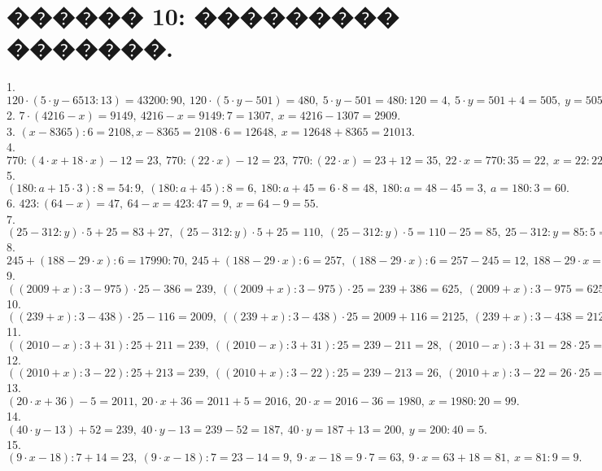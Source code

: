 \documentclass[12pt]{article}
\begin{document}
\section{������ 10: ��������� �������.}
1. $120\cdot(5\cdot y-6513:13)=43200:90,\ 120\cdot(5\cdot y-501)=480,\ 5\cdot y-501=480:120=4,\ 5\cdot y=501+4=505,\ y=505:5=101.$\\
2. $7\cdot(4216-x)=9149,\ 4216-x=9149:7=1307,\ x=4216-1307=2909.$\\
3. $(x-8365):6=2108, x-8365=2108\cdot6=12648,\ x=12648+8365=21013.$\\
4. $770:(4\cdot x+18\cdot x)-12=23,\ 770:(22\cdot x)-12=23,\ 770:(22\cdot x)=23+12=35,\ 22\cdot x=770:35=22,\ x=22:22=1.$\\
5. $(180:a+15\cdot3):8=54:9,\ (180:a+45):8=6,\ 180:a+45=6\cdot8=48,\ 180:a=48-45=3,\ a=180:3=60.$\\
6. $423:(64-x)=47,\ 64-x=423:47=9,\ x=64-9=55.$\\
7. $(25-312:y)\cdot5+25=83+27,\ (25-312:y)\cdot5+25=110,\ (25-312:y)\cdot5=110-25=85,\ 25-312:y=85:5=17,\ 312:y=25-17=8,\ y=312:8=39.$\\
8. $245+(188-29\cdot x):6=17990:70,\ 245+(188-29\cdot x):6=257,\ (188-29\cdot x):6=257-245=12,\ 188-29\cdot x=6\cdot12=72,\ 29\cdot x=188-72=116,\ x=116:29=4.$\\
9. $((2009+x):3-975)\cdot25-386=239,\ ((2009+x):3-975)\cdot25=239+386=625,\ (2009+x):3-975=625:25=25,\ (2009+x):3=25+975=1000,\ 2009+x=3\cdot1000=3000,\ x=3000-2009=991.$\\
10. $((239+x):3-438)\cdot25-116=2009,\ ((239+x):3-438)\cdot25=2009+116=2125,\ (239+x):3-438=2125:25=85,\ (239+x):3=438+85=523,\ 239+x=523\cdot3=1569,\ x=1569-239=1330.$\\
11. $((2010-x):3+31):25+211=239,\ ((2010-x):3+31):25=239-211=28,\ (2010-x):3+31=28\cdot25=700,\ (2010-x):3=700-31=669,\ 2010-x=669\cdot3=2007,\ x=2010-2007=3.$\\
12. $((2010+x):3-22):25+213=239,\ ((2010+x):3-22):25=239-213=26,\ (2010+x):3-22=26\cdot25=650,\ (2010+x):3=650+22=672,\ 2010+x=672\cdot3=2016,\ x=2016-2010=6.$\\
13. $(20\cdot x+36)-5=2011,\ 20\cdot x+36=2011+5=2016,\ 20\cdot x=2016-36=1980,\ x=1980:20=99.$\\
14. $(40\cdot y-13)+52=239,\ 40\cdot y-13=239-52=187,\ 40\cdot y=187+13=200,\ y=200:40=5.$\\
15. $(9\cdot x-18):7+14=23,\ (9\cdot x-18):7=23-14=9,\ 9\cdot x-18=9\cdot7=63,\ 9\cdot x=63+18=81,\ x=81:9=9.$\\
\end{document}
